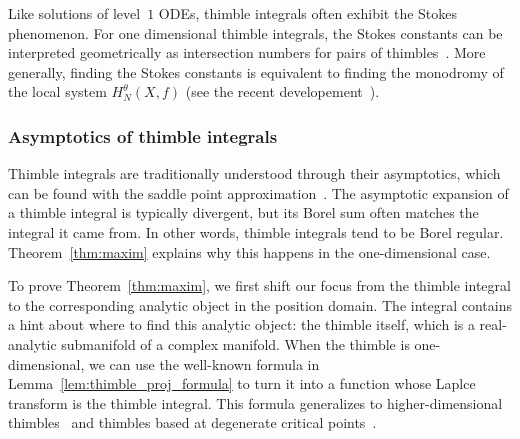 \documentclass{article}
\theoremstyle{definition}
\theoremstyle{plain}
\begin{document}
Like solutions of level~$1$ ODEs, thimble integrals often exhibit the Stokes phenomenon. For one dimensional thimble integrals, the Stokes constants can be interpreted geometrically as intersection numbers for pairs of thimbles~\cite{kontsevich2022analyticity}. More generally, finding the Stokes constants is equivalent to finding the monodromy of the local system $H^\theta_N(X,f)$ (see the recent developement~\cite{kontsevich2024holomorphic}). 
\color{black}
%
\subsubsection{Asymptotics of thimble integrals}
%
Thimble integrals are traditionally understood through their asymptotics, which can be found with the saddle point approximation~\cite{andersen2020resurgence,delabaere-howls,delabaere_dillinger_pham,Delabaere-Pham99,dingle1973asymptotic,Malgrange22,Pham83}. The asymptotic expansion of a thimble integral is typically divergent, but its Borel sum often matches the integral it came from. In other words, thimble integrals tend to be Borel regular. Theorem~\ref{thm:maxim} explains why this happens in the one-dimensional case.

To prove Theorem~\ref{thm:maxim}, we first shift our focus from the thimble integral to the corresponding analytic object in the position domain. The integral contains a hint about where to find this analytic object: the thimble itself, which is a real-analytic submanifold of a complex manifold. When the thimble is one-dimensional, we can use the well-known formula in Lemma~\ref{lem:thimble_proj_formula} to turn it into a function whose Laplce transform is the thimble integral. This formula generalizes to higher-dimensional thimbles~\cite{pham} and thimbles based at degenerate critical points~\cite[Section 1.2.2]{mistegard_phdthesis}.
%
\end{document}
